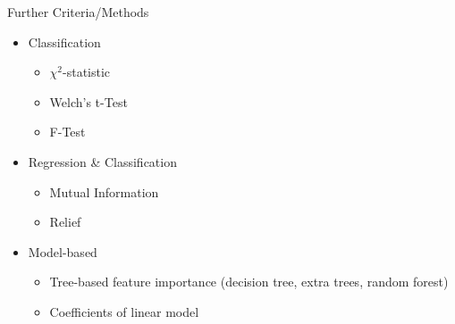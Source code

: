 \documentclass[11pt,compress,t,notes=noshow, xcolor=table]{beamer}
\begin{document}
\begin{frame}{Further Criteria/Methods}
    \begin{itemize}
        \item Classification
        \begin{itemize}
            \item $\chi^2$-statistic
            \item Welch's t-Test
            \item F-Test
            
        \end{itemize}
        \item Regression \& Classification
        \begin{itemize}
            \item Mutual Information
            \item Relief
        \end{itemize}
        \item Model-based
        \begin{itemize}
            \item Tree-based feature importance (decision tree, extra trees, random forest)
            \item Coefficients of linear model
        \end{itemize}
    \end{itemize}
\end{frame}
\end{document}
